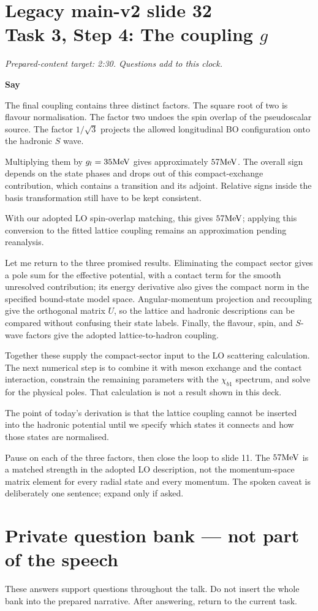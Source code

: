 \documentclass[11pt,a4paper]{article}
\newcommand{\cue}[1]{\begin{private}#1\end{private}}
\newenvironment{speech}{\par\textbf{Say}\par}{\par}
\newcommand{\slidenote}[3]{%
  \clearpage
  \pdfbookmark[1]{Legacy main-v2 slide #1}{legacy-main-v2-slide-#1}%
  \section*{Legacy main-v2 slide #1\\#2}
  \textit{Prepared-content target: #3. Questions add to this clock.}\par
}
\begin{document}
\slidenote{32}{Task 3, Step 4: The coupling $g$}{2:30}
\begin{speech}
The final coupling contains three distinct factors. The square
root of two is flavour normalisation. The factor two undoes
the spin overlap of the pseudoscalar source. The factor
$1/\sqrt3$ projects the allowed longitudinal BO configuration
onto the hadronic $S$ wave.

Multiplying them by $g_l=35\mathrm{MeV}$ gives approximately
$57\mathrm{MeV}$. The overall sign depends on the state phases and
drops out of this compact-exchange contribution, which contains
a transition and its adjoint. Relative signs inside the basis
transformation still have to be kept consistent.

With our adopted LO spin-overlap matching, this gives
$57\mathrm{MeV}$; applying this conversion to the fitted lattice
coupling remains an approximation pending reanalysis.

Let me return to the three promised results. Eliminating the
compact sector gives a pole sum for the effective potential,
with a contact term for the smooth unresolved contribution;
its energy derivative also gives the compact norm in the
specified bound-state model space. Angular-momentum projection
and recoupling give the orthogonal matrix $U$, so the lattice
and hadronic descriptions can be compared without confusing
their state labels. Finally, the flavour, spin, and $S$-wave
factors give the adopted lattice-to-hadron coupling.

Together these supply the compact-sector input to the LO
scattering calculation. The next numerical step is to combine
it with meson exchange and the contact interaction, constrain
the remaining parameters with the $\chi_{b1}$ spectrum, and
solve for the physical poles. That calculation is not a result
shown in this deck.

The point of today's derivation is that the lattice coupling
cannot be inserted into the hadronic potential until we specify
which states it connects and how those states are normalised.
\end{speech}
\cue{Pause on each of the three factors, then close the loop to slide 11.
The $57\mathrm{MeV}$ is a matched strength in the adopted LO description, not the
momentum-space matrix element for every radial state and every momentum.
The spoken caveat is deliberately one sentence; expand only if asked.}

\clearpage
{}
\section*{Private question bank --- not part of the speech}
These answers support questions throughout the talk. Do not insert the whole
bank into the prepared narrative. After answering, return to the current task.
\end{document}
